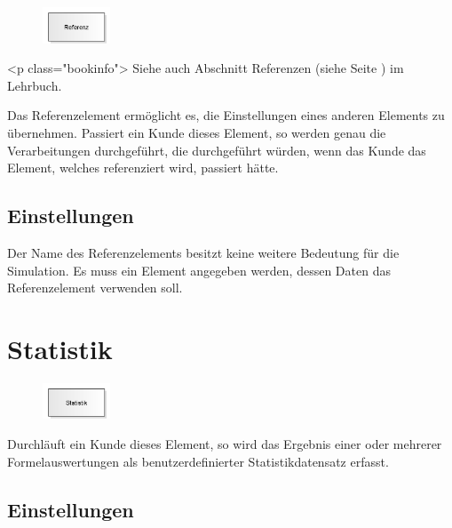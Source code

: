 \begin{figure}
\vspace{-22pt}
\includegraphics[width=2cm]{imageModelElementReference.png}
\vspace{-22pt}
\end{figure}

<p class="bookinfo">
Siehe auch Abschnitt Referenzen (siehe Seite \pageref{ref:book:8.12.2}) im Lehrbuch.

Das Referenzelement ermöglicht es, die Einstellungen eines anderen Elements zu übernehmen.
Passiert ein Kunde dieses Element, so werden genau die Verarbeitungen durchgeführt, die
durchgeführt würden, wenn das Kunde das Element, welches referenziert wird, passiert hätte.

\subsection*{Einstellungen}

Der Name des Referenzelements besitzt keine weitere Bedeutung für die Simulation.
Es muss ein Element angegeben werden, dessen Daten das Referenzelement verwenden soll.


\section{Statistik}
\label{ref:ModelElementUserStatistic}

\begin{figure}
\vspace{-22pt}
\includegraphics[width=2cm]{imageModelElementUserStatistic.png}
\vspace{-22pt}
\end{figure}

Durchläuft ein Kunde dieses Element, so wird das Ergebnis einer oder mehrerer Formelauswertungen
als benutzerdefinierter Statistikdatensatz erfasst.

\subsection*{Einstellungen}

